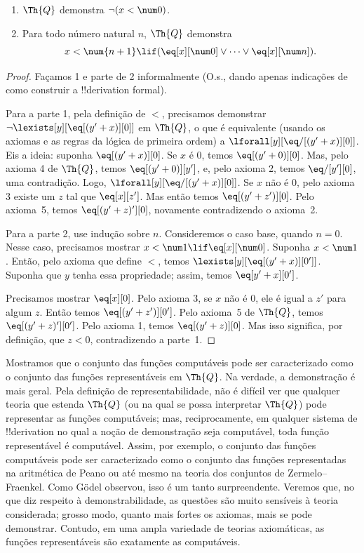 \documentclass[../../../include/open-logic-section]{subfiles}
\begin{document}
\begin{lem}
\begin{enumerate}
\item $\Th{Q}$ demonstra $\lnot (x < \num 0)$.
\item Para todo número natural $n$, $\Th{Q}$ demonstra
\[
x < \num {n+1} \lif (\eq[x][\num 0] \lor \dots \lor \eq[x][\num n]).
\]
\end{enumerate}
\end{lem}

\begin{proof}
Façamos 1 e parte de 2 informalmente (O.s.\@, dando apenas indicações de
como construir a !!{derivation} formal).

Para a parte 1, pela definição de $<$, precisamos demonstrar $\lnot
\lexists[y][\eq[(y'+x)][0]]$ em $\Th{Q}$, o que é equivalente (usando os
axiomas e as regras da lógica de primeira ordem) a
$\lforall[y][\eq/[(y' + x)][0]]$. Eis a ideia: suponha
$\eq[(y'+x)][0]$. Se $x$ é 0, temos $\eq[(y' + 0)][0]$. Mas, pelo axioma 4
de $\Th{Q}$, temos $\eq[(y' + 0)][y']$, e, pelo axioma 2, temos
$\eq/[y'][0]$, uma contradição. Logo, $\lforall[y][\eq/[(y' +x)][0]]$.
Se $x$ não é $0$, pelo axioma 3 existe um $z$ tal que $\eq[x][z']$. Mas
então temos $\eq[(y' + z')][0]$. Pelo axioma~5, temos
$\eq[(y' + z)'][0]$, novamente contradizendo o axioma~2.

Para a parte 2, use indução sobre $n$. Consideremos o caso base, quando
$n =0$. Nesse caso, precisamos mostrar $x < \num 1 \lif \eq[x][\num
  0]$. Suponha $x < \num 1$. Então, pelo axioma que define $<$, temos
$\lexists[y][\eq[(y'+x)][0']]$. Suponha que $y$ tenha essa propriedade;
assim, temos $\eq[y'+x][0']$.

Precisamos mostrar $\eq[x][0]$. Pelo axioma 3, se $x$ não é 0, ele é igual
a $z'$ para algum $z$. Então temos $\eq[(y' + z')][0']$. Pelo axioma~5 de
  $\Th{Q}$, temos $\eq[(y'+z)'][0']$. Pelo axioma 1, temos $\eq[(y' +
    z)][0]$. Mas isso significa, por definição, que $z < 0$, contradizendo
  a parte~1.
\end{proof}

\begin{explain}
Mostramos que o conjunto das funções computáveis pode ser caracterizado
como o conjunto das funções representáveis em $\Th{Q}$. Na verdade, a
demonstração é mais geral. Pela definição de representabilidade, não é
difícil ver que qualquer teoria que estenda $\Th{Q}$ (ou na qual se possa
interpretar $\Th{Q}$) pode representar as funções computáveis; mas,
reciprocamente, em qualquer sistema de !!{derivation} no qual a noção de
demonstração seja computável, toda função representável é computável.
Assim, por exemplo, o conjunto das funções computáveis pode ser
caracterizado como o conjunto das funções representadas na aritmética de
Peano ou até mesmo na teoria dos conjuntos de Zermelo--Fraenkel. Como
G\"odel observou, isso é um tanto surpreendente. Veremos que, no que diz
respeito à demonstrabilidade, as questões são muito sensíveis à teoria
considerada; grosso modo, quanto mais fortes os axiomas, mais se pode
demonstrar. Contudo, em uma ampla variedade de teorias axiomáticas, as
funções representáveis são exatamente as computáveis.
\end{explain}
\end{document}
